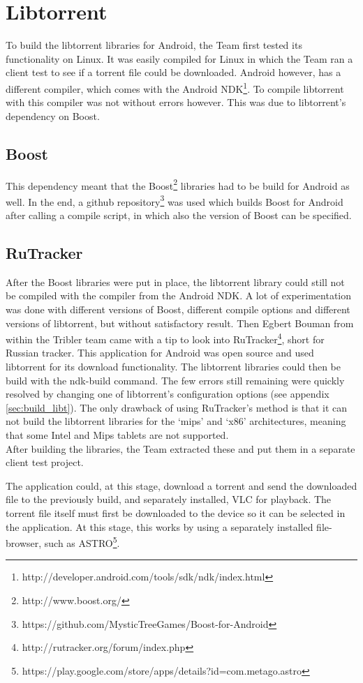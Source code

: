 \section{Libtorrent}
\thispagestyle{fancy}
\label{sec:libtorrent_impl}
To build the libtorrent libraries for Android, the Team first tested its functionality on Linux. It was easily compiled for Linux in which the Team ran a client test to see if a torrent file could be downloaded. Android however, has a different compiler, which comes with the Android NDK\footnote{http://developer.android.com/tools/sdk/ndk/index.html}. To compile libtorrent with this compiler was not without errors however. This was due to libtorrent's dependency on Boost.

\subsection{Boost}
This dependency meant that the Boost\footnote{http://www.boost.org/} libraries had to be build for Android as well. In the end, a github repository\footnote{https://github.com/MysticTreeGames/Boost-for-Android} was used which builds Boost for Android after calling a compile script, in which also the version of Boost can be specified.

\subsection{RuTracker}
After the Boost libraries were put in place, the libtorrent library could still not be compiled with the compiler from the Android NDK. A lot of experimentation was done with different versions of Boost, different compile options and different versions of libtorrent, but without satisfactory result. Then Egbert Bouman from within the Tribler team came with a tip to look into RuTracker\footnote{http://rutracker.org/forum/index.php}, short for Russian tracker. This application for Android was open source and used libtorrent for its download functionality. The libtorrent libraries could then be build with the ndk-build command. The few errors still remaining were quickly resolved by changing one of libtorrent's configuration options (see appendix \ref{sec:build_libt}). The only drawback of using RuTracker's method is that it can not build the libtorrent libraries for the `mips' and `x86' architectures, meaning that some Intel and Mips tablets are not supported.\\ 
After building the libraries, the Team extracted these and put them in a separate client test project. 

The application could, at this stage, download a torrent and send the downloaded file to the previously build, and separately installed, VLC for playback. The torrent file itself must first be downloaded to the device so it can be selected in the application. At this stage, this works by using a separately installed file-browser, such as ASTRO\footnote{https://play.google.com/store/apps/details?id=com.metago.astro}.